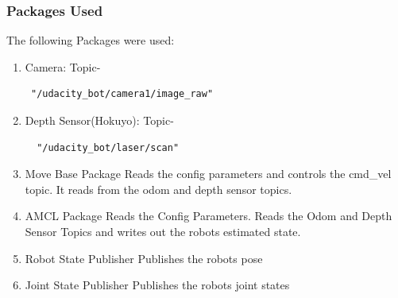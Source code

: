 \documentclass[10pt,journal,compsoc]{IEEEtran}
\begin{document}
\subsubsection{Packages Used}
The following Packages were used:
\begin{enumerate}[i]
\item Camera: Topic- \begin{verbatim} "/udacity_bot/camera1/image_raw" 
\end{verbatim} 
\item Depth Sensor(Hokuyo): Topic-  \begin{verbatim}  "/udacity_bot/laser/scan" 
\end{verbatim}
\item Move Base Package Reads the config parameters and controls the cmd\_vel topic. It reads from the odom and depth sensor topics. 
\item AMCL Package Reads the Config Parameters. Reads the Odom and Depth Sensor Topics and writes out the robots estimated state.
\item Robot State Publisher Publishes the robots pose
\item Joint State Publisher Publishes the robots joint states
\end{enumerate}
\end{document}
